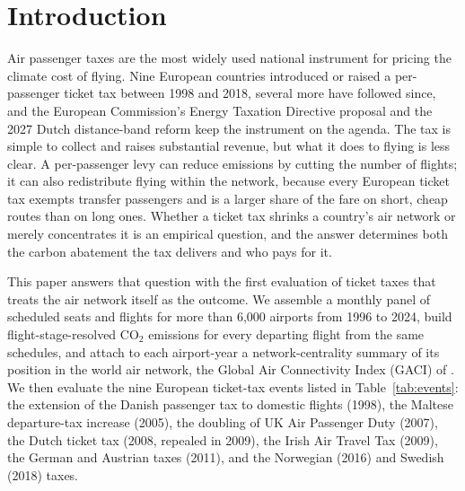 
\section{Introduction}

Air passenger taxes are the most widely used national instrument for pricing the climate cost of flying.
Nine European countries introduced or raised a per-passenger ticket tax between 1998 and 2018, several more
have followed since, and the European Commission's Energy Taxation Directive proposal and the 2027 Dutch
distance-band reform keep the instrument on the agenda. The tax is simple to collect and raises
substantial revenue, but what it does to flying is less clear. A per-passenger levy can reduce emissions
by cutting the number of flights; it can also redistribute flying within the network, because every
European ticket tax exempts transfer passengers and is a larger share of the fare on short, cheap
routes than on long ones. Whether a ticket tax shrinks a country's air network or merely concentrates it
is an empirical question, and the answer determines both the carbon abatement the tax delivers and who
pays for it.

This paper answers that question with the first evaluation of ticket taxes that treats the air network
itself as the outcome. We assemble a monthly panel of scheduled seats and flights for more than 6,000
airports from 1996 to 2024, build flight-stage-resolved CO$_2$ emissions for every departing flight from the
same schedules, and attach to each airport-year a network-centrality summary of its position in the
world air network, the Global Air Connectivity Index (GACI) of \citet{cheung2020}. We then evaluate the
nine European ticket-tax events listed in Table~\ref{tab:events}: the extension of the Danish passenger
tax to domestic flights (1998), the Maltese departure-tax increase (2005), the doubling of UK Air
Passenger Duty (2007), the Dutch ticket tax (2008, repealed in 2009), the Irish Air Travel Tax (2009),
the German and Austrian taxes (2011), and the Norwegian (2016) and Swedish (2018) taxes.

